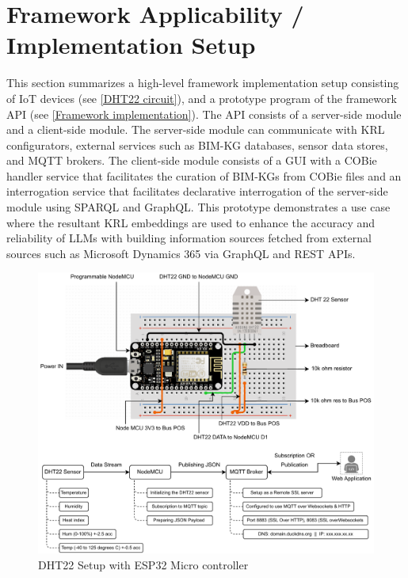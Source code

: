 \section{Framework Applicability / Implementation Setup}
This section summarizes a high-level framework implementation setup consisting of \ac{IoT} devices (see \autoref{DHT22 circuit}), and a prototype program of the framework \ac{API} (see \autoref{Framework implementation}). The \ac{API} consists of a server-side module and a client-side module. The server-side module can communicate with \ac{KRL} configurators, external services such as \ac{BIM-KG} databases, sensor data stores, and \ac{MQTT} brokers. The client-side module consists of a \ac{GUI} with a \ac{COBie} handler service that facilitates the curation of \acp{BIM-KG} from \ac{COBie} files and an interrogation service that facilitates declarative interrogation of the server-side module using \ac{SPARQL} and \ac{GraphQL}. This prototype demonstrates a use case where the resultant \ac{KRL} embeddings are used to enhance the accuracy and reliability of \acp{LLM} with building information sources fetched from external sources such as Microsoft Dynamics 365 via GraphQL and REST \ac{API}s.
\begin{figure}[h]
        \centering
        \includegraphics[width=1\textwidth]{figures/DHT22 Circuit.pdf}
        \caption{DHT22 Setup with ESP32 Micro controller}\label{DHT22 circuit}
\end{figure}
